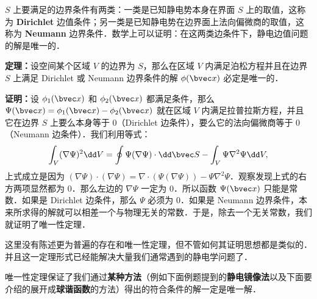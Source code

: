 $S$ 上要满足的边界条件有两类：一类是已知静电势本身在界面 $S$
上的取值，这称为 \textbf{Dirichlet} 边值条件；另一类是已知静电势在边界面上法向偏微商的取值，这称为 \textbf{Neumann} 边界条件．数学上可以证明：在这两类边条件下，静电边值问题的解是唯一的．

\textbf{定理：}设空间某个区域 $V$ 的边界为 $S$，那么在区域 $V$ 内满足泊松方程并且在边界 $S$ 上满足 Dirichlet 或 Neumann 边界条件的解 $\phi(\bvec x)$ 必定是唯一的．

\textbf{证明：}设 $\phi_1(\bvec x)$ 和 $\phi_2(\bvec x)$ 都满足条件，那么 $\Psi(\bvec x)=\phi_1(\bvec x)-\phi_2(\bvec x)$ 就在区域 $V$ 内满足拉普拉斯方程，并且它在边界 $S$ 上要么本身等于 $0$（Dirichlet 边条件），要么它的法向偏微商等于 $0$（Neumann 边条件）．我们利用等式：
\begin{align}
\int_V (\nabla \Psi)^2 \dd V=\oint \Psi(\nabla \Psi)\cdot \dd \bvec S - \int_V \Psi \nabla^2\Psi \dd V,
\end{align}
上式成立是因为 $(\nabla \Psi)\cdot (\nabla \Psi)=\nabla\cdot (\Psi(\nabla\Psi))-\Psi\nabla^2\Psi$．观察发现上式的右方两项显然都为 $0$．那么左边的 $\nabla\Psi$ 一定为 $0$．所以函数 $\Psi(\bvec x)$ 只能是常数．如果是 Dirichlet 边条件，那么 $\Psi$ 必须为 $0$．如果是 Neumann 边界条件，本来所求得的解就可以相差一个与物理无关的常数．于是，除去一个无关常数，我们就证明了唯一性定理．

这里没有陈述更为普遍的存在和唯一性定理，但不管如何其证明思想都是类似的．并且这一定理形式已经能解决大量我们通常遇到的静电学问题了．

唯一性定理保证了我们通过\textbf{某种方法}（例如下面例题提到的\textbf{静电镜像法}以及下面要介绍的展开成\textbf{球谐函数}的方法）得出的符合条件的解一定是唯一解．

